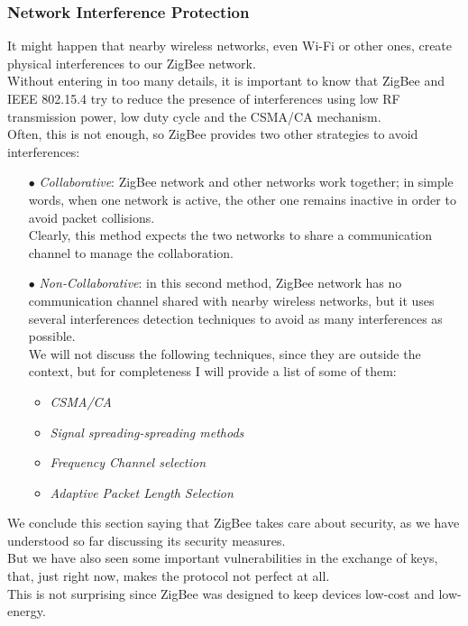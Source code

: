 \documentclass[12pt]{report}
\begin{document}
\subsubsection{Network Interference Protection}
\bigskip
It might happen that nearby wireless networks, even Wi-Fi or other ones, create physical interferences to our ZigBee network.\\
Without entering in too many details, it is important to know that ZigBee and IEEE 802.15.4 try to reduce the presence of interferences using low RF transmission power, low duty cycle and the CSMA/CA mechanism.\\
Often, this is not enough, so ZigBee provides two other strategies to avoid interferences:

\begin{itemize}
\setlength{\itemindent}{+4mm}
\item[$\bullet$] \emph{Collaborative}: ZigBee network and other networks work together; in simple words, when one network is active, the other one remains inactive in order to avoid packet collisions.\\
Clearly, this method expects the two networks to share a communication channel to manage the collaboration.

\item[$\bullet$] \emph{Non-Collaborative}: in this second method, ZigBee network has no communication channel shared with nearby wireless networks, but it uses several interferences detection techniques to avoid as many interferences as possible.\\
We will not discuss the following techniques, since they are outside the context, but for completeness I will provide a list of some of them:

\begin{itemize}
\setlength{\itemindent}{+4mm}
\item \emph{CSMA/CA}
\item \emph{Signal spreading-spreading methods}
\item \emph{Frequency Channel selection}
\item \emph{Adaptive Packet Length Selection}\\
\end{itemize}

\end{itemize}


We conclude this section saying that ZigBee takes care about security, as we have understood so far discussing its security measures.\\
But we have also seen some important vulnerabilities in the exchange of keys, that, just right now, makes the protocol not perfect at all.\\
This is not surprising since ZigBee was designed to keep devices low-cost and low-energy.\\
\end{document}
